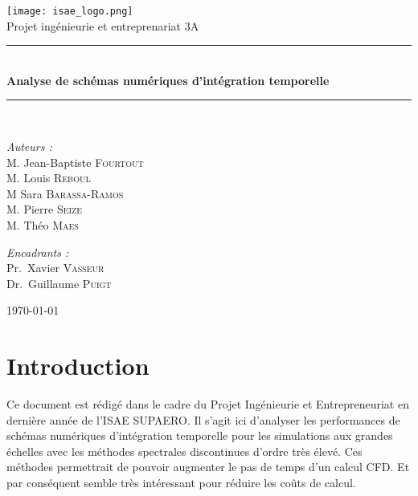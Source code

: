 \documentclass[a4paper,12pt]{report}
\theoremstyle{break}
\begin{document}

\begin{titlepage}
\begin{center}

\texttt{[image: isae\_logo.png]}\\[1cm]

{\large Projet ingénieurie et entreprenariat 3A}\\[0.5cm]


\rule{\linewidth}{0.5mm} \\[0.4cm]
{\huge \bfseries Analyse de schémas numériques d'intégration temporelle \\[0.4cm] }
\rule{\linewidth}{0.5mm} \\[1.5cm]

\noindent
\begin{minipage}{0.4\textwidth}
  \begin{flushleft} \large
    \emph{Auteurs :}\\
    M. Jean-Baptiste \textsc{Fourtout}\\
    M. Louis \textsc{Reboul}\\
    M Sara \textsc{Barassa-Ramos}\\
    M. Pierre \textsc{Seize} \\
    M. Théo   \textsc{Maes}
  \end{flushleft}
\end{minipage}%
\begin{minipage}{0.4\textwidth}
  \begin{flushright} \large
    \emph{Encadrants :} \\
    Pr.~Xavier \textsc{Vasseur}\\
    Dr.~Guillaume \textsc{Puigt}
  \end{flushright}
\end{minipage}

\vfill

\today
\end{center}
\end{titlepage}  

\tableofcontents

\chapter*{Introduction}
Ce document est rédigé dans le cadre du Projet Ingénieurie et Entrepreneuriat en dernière année de l'ISAE SUPAERO. Il s'agit ici d'analyser les performances de schémas numériques d’intégration
temporelle pour les simulations aux grandes échelles avec les méthodes spectrales discontinues d'ordre très élevé. Ces méthodes permettrait de pouvoir augmenter le pas de temps d'un calcul CFD. Et par conséquent semble très intéressant pour réduire les coûts de calcul.
\end{document}
